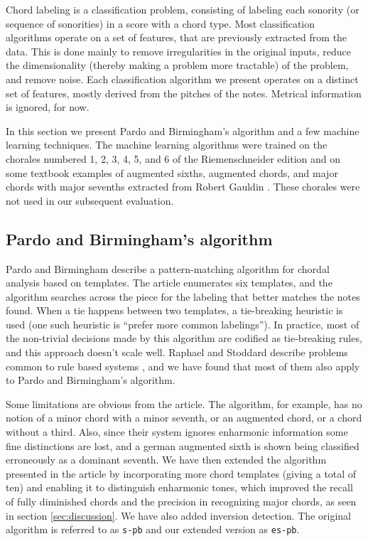 \documentclass{article}
\begin{document}
Chord labeling is a classification problem, consisting of labeling
each sonority (or sequence of sonorities) in a score with a chord
type. Most classification algorithms operate on a set of features,
that are previously extracted from the data. This is done mainly to
remove irregularities in the original inputs, reduce the
dimensionality (thereby making a problem more tractable) of the
problem, and remove noise. Each classification algorithm we present
operates on a distinct set of features, mostly derived from the
pitches of the notes. Metrical information is ignored, for now.

In this section we present Pardo and Birmingham's algorithm and a few
machine learning techniques. The machine learning algorithms were
trained on the chorales numbered 1, 2, 3, 4, 5, and 6 of the
Riemenschneider edition and on some textbook examples of augmented
sixths, augmented chords, and major chords with major sevenths
extracted from Robert Gauldin
\cite{gauldin:harmonic}. These chorales were not
used in our subsequent evaluation.

\subsection{Pardo and Birmingham's algorithm}
\label{sec:pardo}


Pardo and Birmingham \cite{pardo.ea:algorithms} describe a
pattern-matching algorithm for chordal analysis based on templates.
The article enumerates six templates, and the algorithm searches
across the piece for the labeling that better matches the notes found.
When a tie happens between two templates, a tie-breaking heuristic is
used (one such heuristic is ``prefer more common labelings''). In
practice, most of the non-trivial decisions made by this algorithm are
codified as tie-breaking rules, and this approach doesn't scale
well. Raphael and Stoddard describe problems common to rule based
systems \cite{raphael.ea:harmonic}, and we have found that most of
them also apply to Pardo and Birmingham's algorithm.

Some limitations are obvious from the article. The algorithm, for
example, has no notion of a minor chord with a minor seventh, or an
augmented chord, or a chord without a third. Also, since their system
ignores enharmonic information some fine distinctions are lost, and a
german augmented sixth is shown being classified erroneously as a
dominant seventh. We have then extended the algorithm presented in the
article by incorporating more chord templates (giving a total of ten)
and enabling it to distinguish enharmonic tones, which improved the
recall of fully diminished chords and the precision in recognizing
major chords, as seen in section \ref{sec:discussion}. We have also
added inversion detection. The original algorithm is referred to as
\texttt{s-pb} and our extended version as \texttt{es-pb}.
\end{document}
